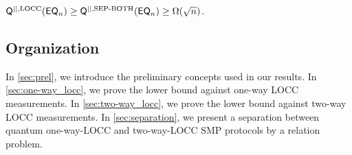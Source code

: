 \begin{conjecture}\label{conj}
    $\mathsf{Q}^{||,\mathrm{LOCC}}(\mathsf{EQ}_n) \geq \mathsf{Q}^{||,\mathrm{SEP\text{-}BOTH}}(\mathsf{EQ}_n) \geq \Omega(\sqrt{n})$.
\end{conjecture}

\subsection{Organization}

In \cref{sec:prel}, we introduce the preliminary concepts used in our results. In \cref{sec:one-way_locc}, we prove the lower bound against one-way LOCC measurements. In \cref{sec:two-way_locc}, we prove the lower bound against two-way LOCC measurements. In \cref{sec:separation}, we present a separation between quantum one-way-LOCC and two-way-LOCC SMP protocols by a relation problem. 